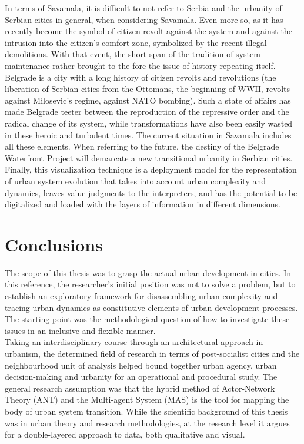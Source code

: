 \documentclass[11pt]{report}
\begin{document}
{{{In terms of Savamala, it is difficult to not refer to Serbia and the urbanity of Serbian cities in general, when considering Savamala. Even more so, as it has recently become the symbol of citizen revolt against the system and against the intrusion into the citizen’s comfort zone, symbolized by the recent illegal demolitions. With that event, the short span of the tradition of system maintenance rather brought to the fore the issue of history repeating itself. Belgrade is a city with a long history of citizen revolts and revolutions (the liberation of Serbian cities from the Ottomans, the beginning of WWII, revolts against Milosevic’s regime, against NATO bombing). Such a  state of affairs has made Belgrade teeter between the reproduction of the repressive order and the radical change of its system, while transformations have also been easily wasted in these heroic and turbulent times. The current situation in Savamala includes all these elements. When referring to the future, the destiny of the Belgrade Waterfront Project will demarcate a new transitional urbanity in Serbian cities.
\\

Finally, this visualization technique is a deployment model for the representation of urban system evolution that takes into account urban complexity and dynamics, leaves value judgments to the interpreters, and has the potential to be digitalized and loaded with the layers of information in different dimensions.


\chapter{Conclusions}


The scope of this thesis was to grasp the actual urban development  in cities.
In this reference, the researcher's initial position was not to solve a problem, but to establish an exploratory framework for disassembling urban complexity and tracing urban dynamics as constitutive elements of urban development processes.
The starting point was the methodological question of how to investigate these issues in an inclusive and flexible manner.
\\

Taking an interdisciplinary course through an architectural approach in urbanism, the determined field of research in terms of post-socialist cities and the neighbourhood unit of analysis helped bound together urban agency, urban decision-making and urbanity for an operational and procedural study. The general research assumption was that the hybrid method of Actor-Network Theory (ANT) and the Multi-agent System (MAS) is the tool for mapping the body of urban system transition. While the scientific background of this thesis was in urban theory and research methodologies, at the research level it argues for a double-layered approach to data, both qualitative and visual.  
\\

}}}
\end{document}
